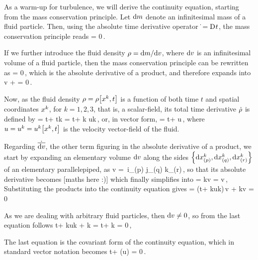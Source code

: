 As a warm-up for turbulence, we will derive the continuity equation, starting from the mass conservation principle. Let $\dx m$ denote an infinitesimal mass of a fluid particle. Then, using the absolute time derivative operator $\abstder{} = \mder t{}$, the mass conservation principle reads
\beq
{} = 0\,.
\eeq

If we further introduce the fluid density $\rho = \dx m/\dx v$, where $\dx v$ is an infinitesimal volume of a fluid particle, then the mass conservation principle can be rewritten as
\beq
{} = 0\,,
\eeq
which is the absolute derivative of a product, and therefore expands into
\beq
\dt\rho \dx v + \rho{} = 0\,.
\eeq

Now, as the fluid density $\rho = \rho\vat{\scoord k, t}$ is a function of both time $t$ and spatial coordinates $\scoord k$, for $k = 1,2,3$, that is, a scalar-field, its total time derivative $\dt\rho$ is defined by
\beq
\dt\rho = \igder t\rho + \rho\igder t\scoord k 
        = \igder t\rho + \coder\rho k \cntens uk\,,
\eeq
or, in vector form,
\beq
\dt\rho = \igder t\rho + \grad\rho\iprod u\,,
\eeq
where $u = \cntens uk = \cntens uk\vat{\scoord k, t}$ is the velocity vector-field of the fluid.

Regarding $\abstder{\dx v}$, the other term figuring in the absolute derivative of a product, we start by expanding an elementary volume $\dx v$ along the sides $\elset{\dx\scoord i_{(p)}, \dx\scoord j_{(q)}, \dx\scoord k_{(r)}}$ of an elementary parallelepiped, as
\beq
\dx v = \,\dx\scoord i_{(p)} \dx\scoord j_{(q)} \dx\scoord k_{(r)}\,,\qquad
    [i,j,k,p,q,r = 1,2,3]
\eeq
so that its absolute derivative becomes [maths here :)] which finally simplifies into
\beq
{} = k\dx v = \dx v\,,
\eeq
Substituting the products into the continuity equation gives
\beq
{} = \left(\igder t\rho + \coder\rho k\cntens uk\right)\,\dx v 
                        + \rho{}k\dx v 
                     = 0
\eeq

As we are dealing with arbitrary fluid particles, then $\dx v \neq 0$, so from the last equation follows
\beq
\igder t\rho + \coder\rho k\cntens uk + \rho{}k =
    \igder t\rho + k = 0\,,
\eeq

The last equation is the covariant form of the continuity equation, which in standard vector notation becomes
\beq
\igder t\rho + \div(\rho u) = 0\,.
\eeq


